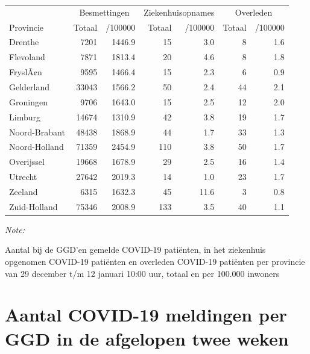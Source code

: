 \documentclass[
  english,
  man,floatsintext]{apa6}
\begin{document}
\begin{table}
\centering
\begin{threeparttable}
\begin{tabular}{lrrrrrr}
\toprule
\multicolumn{1}{c}{ } & \multicolumn{2}{c}{Besmettingen} & \multicolumn{2}{c}{Ziekenhuisopnames} & \multicolumn{2}{c}{Overleden} \\
\cmidrule(l{3pt}r{3pt}){2-3} \cmidrule(l{3pt}r{3pt}){4-5} \cmidrule(l{3pt}r{3pt}){6-7}
Provincie & Totaal & /100000 & Totaal & /100000 & Totaal & /100000\\
\midrule
Drenthe & 7201 & 1446.9 & 15 & 3.0 & 8 & 1.6\\
Flevoland & 7871 & 1813.4 & 20 & 4.6 & 8 & 1.8\\
FryslÃ¢n & 9595 & 1466.4 & 15 & 2.3 & 6 & 0.9\\
Gelderland & 33043 & 1566.2 & 50 & 2.4 & 44 & 2.1\\
Groningen & 9706 & 1643.0 & 15 & 2.5 & 12 & 2.0\\
Limburg & 14674 & 1310.9 & 42 & 3.8 & 19 & 1.7\\
Noord-Brabant & 48438 & 1868.9 & 44 & 1.7 & 33 & 1.3\\
Noord-Holland & 71359 & 2454.9 & 110 & 3.8 & 50 & 1.7\\
Overijssel & 19668 & 1678.9 & 29 & 2.5 & 16 & 1.4\\
Utrecht & 27642 & 2019.3 & 14 & 1.0 & 23 & 1.7\\
Zeeland & 6315 & 1632.3 & 45 & 11.6 & 3 & 0.8\\
Zuid-Holland & 75346 & 2008.9 & 133 & 3.5 & 40 & 1.1\\
\bottomrule
\end{tabular}
\begin{tablenotes}
\item \textit{Note: } 
\item Aantal bij de GGD’en gemelde COVID-19 patiënten, in het ziekenhuis opgenomen COVID-19 patiënten en overleden COVID-19 patiënten per provincie van 29 december t/m 12 januari 10:00 uur, totaal en per 100.000 inwoners
\end{tablenotes}
\end{threeparttable}
\end{table}

\newpage

\hypertarget{aantal-covid-19-meldingen-per-ggd-in-de-afgelopen-twee-weken}{%
\section{Aantal COVID-19 meldingen per GGD in de afgelopen twee weken}\label{aantal-covid-19-meldingen-per-ggd-in-de-afgelopen-twee-weken}}
\end{document}
